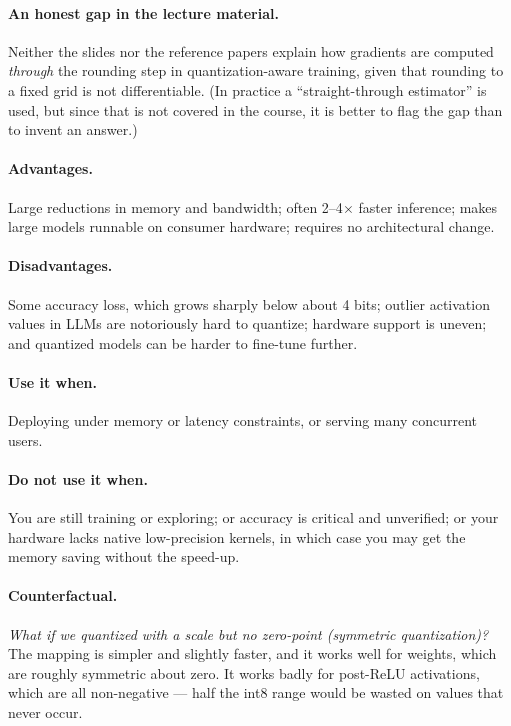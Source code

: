 \documentclass[11pt,a4paper]{article}
\begin{document}
\paragraph{An honest gap in the lecture material.} Neither the slides nor the reference papers
explain how gradients are computed \emph{through} the rounding step in quantization-aware
training, given that rounding to a fixed grid is not differentiable. (In practice a
``straight-through estimator'' is used, but since that is not covered in the course, it is
better to flag the gap than to invent an answer.)

\paragraph{Advantages.} Large reductions in memory and bandwidth; often 2--4$\times$ faster
inference; makes large models runnable on consumer hardware; requires no architectural change.

\paragraph{Disadvantages.} Some accuracy loss, which grows sharply below about 4 bits;
outlier activation values in LLMs are notoriously hard to quantize; hardware support is
uneven; and quantized models can be harder to fine-tune further.

\paragraph{Use it when.} Deploying under memory or latency constraints, or serving many
concurrent users.
\paragraph{Do not use it when.} You are still training or exploring; or accuracy is critical
and unverified; or your hardware lacks native low-precision kernels, in which case you may get
the memory saving without the speed-up.

\paragraph{Counterfactual.} \emph{What if we quantized with a scale but no zero-point
(symmetric quantization)?} The mapping is simpler and slightly faster, and it works well for
weights, which are roughly symmetric about zero. It works badly for post-ReLU activations,
which are all non-negative --- half the int8 range would be wasted on values that never occur.
\end{document}
